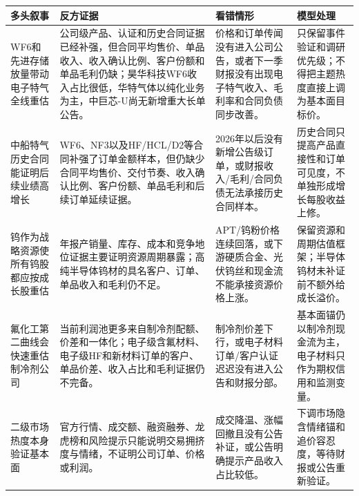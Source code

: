 \begin{exhibitbox}[反方证据与看错情形]
\scriptsize
\begin{tabularx}{\exhibitboxwidth}{L{2.35cm} X X X}
\toprule
\textbf{多头叙事} & \textbf{反方证据} & \textbf{看错情形} & \textbf{模型处理} \\
\midrule
WF6和先进存储放量带动电子特气全线重估 & 公司级产品、认证和历史合同证据已经补强，但合同平均售价、单品收入、收入确认比例、客户份额和单品毛利仍缺；昊华科技WF6收入占比很低，华特气体以纯化业务为主，中巨芯-U尚无新增重大长单公告。 & 价格和订单传闻没有进入公司公告，或者下一季财报没有出现电子特气收入、毛利率和合同负债同步改善。 & 只保留事件验证和调研优先级；不得把主题热度直接上调为基本面目标价。 \\
中船特气历史合同能证明后续业绩高增长 & WF6、NF3以及HF/HCL/D2等合同补强了订单金额样本，但仍缺少合同平均售价、交付节奏、收入确认比例、客户份额、单品毛利和后续订单延续证据。 & 2026年以后没有新增公告级订单，或财报收入/毛利/合同负债无法承接历史合同样本。 & 历史合同只提高产品直接性和订单可见度，不单独形成增长每股收益上修。 \\
钨作为战略资源使所有钨股都应按成长股重估 & 年报产销量、库存、成本和竞争地位证据主要证明资源周期暴露；高纯半导体钨材的具名客户、订单、单品收入和毛利仍不足。 & APT/钨粉价格连续回落，或下游硬质合金、光伏钨丝和现金流不能承接资源价格上涨。 & 保留资源和周期估值框架；半导体钨材未补证前不额外给成长溢价。 \\
氟化工第二曲线会快速重估制冷剂公司 & 当前利润池更多来自制冷剂配额、价差和一体化；电子级含氟材料、电子级HF和新材料订单的客户、单品价差、收入占比和毛利证据仍不完备。 & 制冷剂价差下行，或电子材料订单/客户认证迟迟没有进入公告和财报分部。 & 基本面锚仍以制冷剂现金流为主，电子材料只作为期权信用和监测变量。 \\
二级市场热度本身验证基本面 & 官方行情、成交额、融资融券、龙虎榜和风险提示只能说明交易拥挤度与情绪，不证明公司订单、价格或利润。 & 成交降温、涨幅回撤且没有公告补证，或公告明确提示产品收入占比较低。 & 下调市场隐含情绪锚和追价容忍度，等待财报或公告重新验证。 \\
\bottomrule
\end{tabularx}
\end{exhibitbox}


